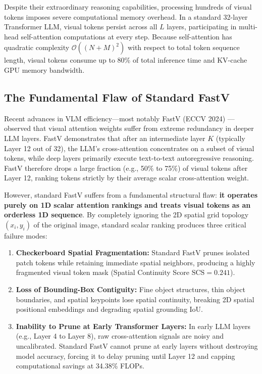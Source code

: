 \documentclass[conference]{IEEEtran}
\begin{document}
Despite their extraordinary reasoning capabilities, processing hundreds of visual tokens imposes severe computational memory overhead. In a standard 32-layer Transformer LLM, visual tokens persist across all $L$ layers, participating in multi-head self-attention computations at every step. Because self-attention has quadratic complexity $\mathcal{O}((N + M)^2)$ with respect to total token sequence length, visual tokens consume up to 80\% of total inference time and KV-cache GPU memory bandwidth.

\subsection{The Fundamental Flaw of Standard FastV}
Recent advances in VLM efficiency---most notably FastV (ECCV 2024) \cite{chen2024fastv}---observed that visual attention weights suffer from extreme redundancy in deeper LLM layers. FastV demonstrates that after an intermediate layer $K$ (typically Layer 12 out of 32), the LLM's cross-attention concentrates on a subset of visual tokens, while deep layers primarily execute text-to-text autoregressive reasoning. FastV therefore drops a large fraction (e.g., 50\% to 75\%) of visual tokens after Layer 12, ranking tokens strictly by their average scalar cross-attention weight.

However, standard FastV suffers from a fundamental structural flaw: \textbf{it operates purely on 1D scalar attention rankings and treats visual tokens as an orderless 1D sequence}. By completely ignoring the 2D spatial grid topology $(x_i, y_i)$ of the original image, standard scalar ranking produces three critical failure modes:
\begin{enumerate}
    \item \textbf{Checkerboard Spatial Fragmentation:} Standard FastV prunes isolated patch tokens while retaining immediate spatial neighbors, producing a highly fragmented visual token mask (Spatial Continuity Score $\text{SCS} = 0.241$).
    \item \textbf{Loss of Bounding-Box Contiguity:} Fine object structures, thin object boundaries, and spatial keypoints lose spatial continuity, breaking 2D spatial positional embeddings and degrading spatial grounding IoU.
    \item \textbf{Inability to Prune at Early Transformer Layers:} In early LLM layers (e.g., Layer 4 to Layer 8), raw cross-attention signals are noisy and uncalibrated. Standard FastV cannot prune at early layers without destroying model accuracy, forcing it to delay pruning until Layer 12 and capping computational savings at 34.38\% FLOPs.
\end{enumerate}
\end{document}
